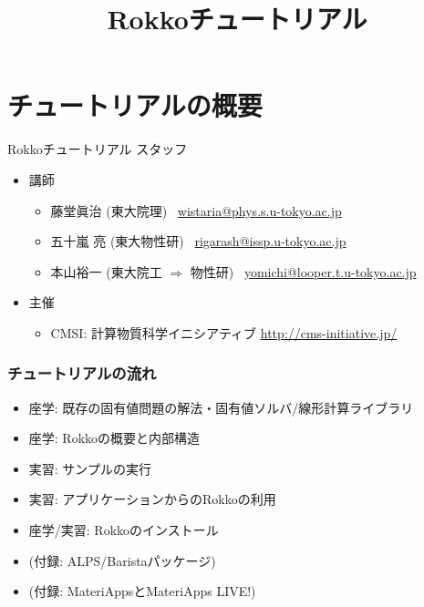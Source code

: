 \title{Rokkoチュートリアル}




\begin{frame}
  \titlepage
\end{frame}


\section{チュートリアルの概要}

\begin{frame}{Rokkoチュートリアル スタッフ}
  \begin{itemize}
  \item 講師
    \setlength{\itemsep}{1em}
    \begin{itemize}
      \setlength{\itemsep}{1em}
    \item 藤堂眞治 (東大院理) \ \href{mailto:wistaria@phys.s.u-tokyo.ac.jp}{wistaria@phys.s.u-tokyo.ac.jp}
    \item 五十嵐 亮 (東大物性研) \ \href{mailto:rigarash@issp.u-tokyo.ac.jp}{rigarash@issp.u-tokyo.ac.jp}
    \item 本山裕一 (東大院工 $\Rightarrow $ 物性研) \ \href{mailto:yomichi@looper.u-tokyo.ac.jp}{yomichi@looper.t.u-tokyo.ac.jp}
    \end{itemize}
  \item 主催
    \begin{itemize}
    \item CMSI: 計算物質科学イニシアティブ \url{http://cms-initiative.jp/}
    \end{itemize}
  \end{itemize}
\end{frame}

\begin{frame}
  \frametitle{チュートリアルの流れ}
  \begin{itemize}
  \item 座学: 既存の固有値問題の解法・固有値ソルバ/線形計算ライブラリ
  \item 座学: Rokkoの概要と内部構造
  \item 実習: サンプルの実行
  \item 実習: アプリケーションからのRokkoの利用
  \item 座学/実習: Rokkoのインストール
  \item (付録: ALPS/Baristaパッケージ)
  \item (付録: MateriAppsとMateriApps LIVE!)
  \end{itemize}
\end{frame}

